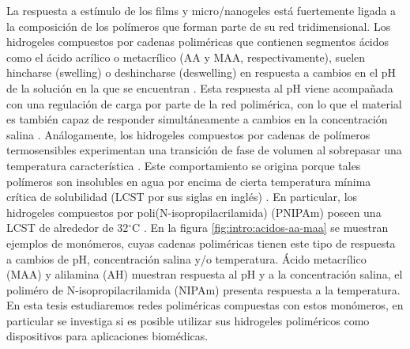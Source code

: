 La respuesta a est\'imulo de los films y micro/nanogeles est\'a fuertemente ligada a la composici\'on de los pol\'imeros que forman parte de su red tridimensional.
Los hidrogeles compuestos por cadenas polim\'ericas que contienen segmentos \'acidos como el \'acido acr\'ilico o metacr\'ilico (AA y MAA, respectivamente), suelen hincharse (swelling) o deshincharse (deswelling) en respuesta a cambios en el pH de la soluci\'on en la que se encuentran \cite{snowden1996colloidal}.
Esta respuesta al pH viene acompa\~nada con una regulaci\'on de carga por parte de la red polim\'erica, con lo que el material es tambi\'en capaz de responder simult\'aneamente a cambios en la concentraci\'on salina \cite{longo2019protonation}.
An\'alogamente, los hidrogeles compuestos por cadenas de pol\'imeros termosensibles experimentan una transici\'on de fase de volumen al sobrepasar una temperatura caracter\'istica \cite{Pelton1986,Pelton2000}.
Este comportamiento se origina porque tales pol\'imeros son insolubles en agua por encima de cierta temperatura m\'inima cr\'itica de solubilidad (LCST por sus siglas en ingl\'es) \cite{Kawaguchi2020}.
En particular, los hidrogeles compuestos por poli(N-isopropilacrilamida) (PNIPAm) poseen una LCST de alrededor de 32$^\circ$C \cite{Schild1992}.
En la figura \ref{fig:intro:acidos-aa-maa} se muestran ejemplos de mon\'omeros, cuyas cadenas polim\'ericas tienen este tipo de respuesta a cambios de  pH, concentraci\'on salina y/o temperatura. \'Acido metacr\'ilico (MAA) y  alilamina (AH) muestran respuesta al pH y a la concentraci\'on salina, el polim\'ero de  N-isopropilacrilamida (NIPAm)  presenta respuesta a la temperatura.
En esta tesis estudiaremos redes polim\'ericas compuestas con estos mon\'omeros, en particular se investiga si es posible utilizar sus hidrogeles polim\'ericos como dispositivos para aplicaciones biom\'edicas.  


